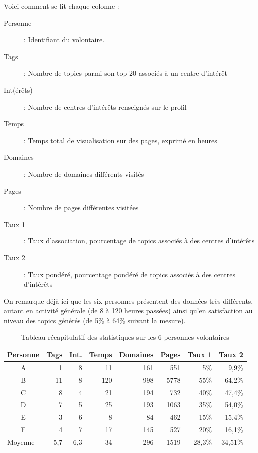 			Voici comment se lit chaque colonne :
			\begin{description}
				\item[Personne] : Identifiant du volontaire.
				\item[Tags] : Nombre de topics parmi son top 20 associés à un centre d'intérêt
				\item[Int(érêts)] : Nombre de centres d'intérêts renseignés sur le profil
				\item[Temps] : Temps total de visualisation sur des pages, exprimé en heures
				\item[Domaines] : Nombre de domaines différents visités
				\item[Pages] : Nombre de pages différentes visitées
				\item[Taux 1] : Taux d'association, pourcentage de topics associés à des centres d'intérêts
				\item[Taux 2] : Taux pondéré, pourcentage pondéré de topics associés à des centres d'intérêts
			\end{description}

			On remarque déjà ici que les six personnes présentent des données très différents, autant en activité générale (de 8 à 120 heures passées) ainsi qu'en satisfaction au niveau des topics générés (de 5\% à 64\% suivant la mesure). 

			\begin{table}[]
\centering
\begin{tabular}{crrrrrrr}
\multicolumn{1}{l}{\textbf{Personne}} & \multicolumn{1}{l}{\textbf{Tags}} & \multicolumn{1}{l}{\textbf{Int.}} & \multicolumn{1}{l}{\textbf{Temps}} & \multicolumn{1}{l}{\textbf{Domaines}} & \multicolumn{1}{l}{\textbf{Pages}} & \multicolumn{1}{l}{\textbf{Taux 1}} & \multicolumn{1}{l}{\textbf{Taux 2}} \\ \hline
A & 1 & 8 & 11 & 161 & 551 & 5\% & 9,9\% \\
B & 11 & 8 & 120 & 998 & 5778 & 55\% & 64,2\% \\
C & 8 & 4 & 21 & 194 & 732 & 40\% & 47,4\% \\
D & 7 & 5 & 25 & 193 & 1063 & 35\% & 54,0\% \\
E & 3 & 6 & 8 & 84 & 462 & 15\% & 15,4\% \\
F & 4 & 7 & 17 & 145 & 527 & 20\% & 16,1\% \\ \hline
\multicolumn{1}{l}{Moyenne} & 5,7 & 6,3 & 34 & 296 & 1519 & 28,3\% & 34,51\%
\end{tabular}
\caption{Tableau récapitulatif des statistiques sur les 6 personnes volontaires}
\label{profiles-table}
\end{table}

